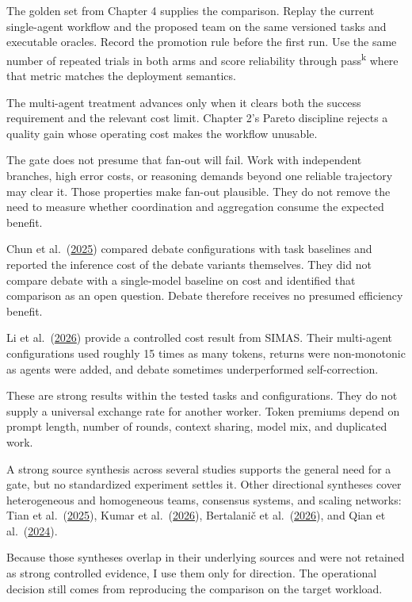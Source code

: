 The golden set from Chapter 4 supplies the comparison. Replay the current single-agent workflow and the proposed team on the same versioned tasks and executable oracles. Record the promotion rule before the first run. Use the same number of repeated trials in both arms and score reliability through pass\textsuperscript{k} where that metric matches the deployment semantics.

The multi-agent treatment advances only when it clears both the success requirement and the relevant cost limit. Chapter 2's Pareto discipline rejects a quality gain whose operating cost makes the workflow unusable.

The gate does not presume that fan-out will fail. Work with independent branches, high error costs, or reasoning demands beyond one reliable trajectory may clear it. Those properties make fan-out plausible. They do not remove the need to measure whether coordination and aggregation consume the expected benefit.

Chun et al.~(\href{https://arxiv.org/abs/2503.12029}{2025}) compared debate configurations with task baselines and reported the inference cost of the debate variants themselves. They did not compare debate with a single-model baseline on cost and identified that comparison as an open question. Debate therefore receives no presumed efficiency benefit.

Li et al.~(\href{https://arxiv.org/abs/2606.00655}{2026}) provide a controlled cost result from SIMAS. Their multi-agent configurations used roughly 15 times as many tokens, returns were non-monotonic as agents were added, and debate sometimes underperformed self-correction.

These are strong results within the tested tasks and configurations. They do not supply a universal exchange rate for another worker. Token premiums depend on prompt length, number of rounds, context sharing, model mix, and duplicated work.

A strong source synthesis across several studies supports the general need for a gate, but no standardized experiment settles it. Other directional syntheses cover heterogeneous and homogeneous teams, consensus systems, and scaling networks: Tian et al.~(\href{https://arxiv.org/abs/2509.23537}{2025}), Kumar et al.~(\href{https://arxiv.org/abs/2604.13120}{2026}), Bertalani\v{c} et al.~(\href{https://arxiv.org/abs/2605.00914}{2026}), and Qian et al.~(\href{https://arxiv.org/abs/2406.07155}{2024}).

Because those syntheses overlap in their underlying sources and were not retained as strong controlled evidence, I use them only for direction. The operational decision still comes from reproducing the comparison on the target workload.

